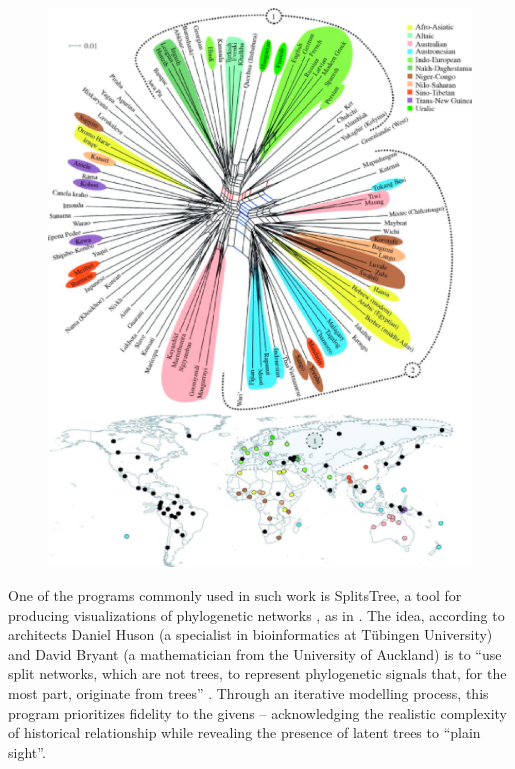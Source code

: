 \documentclass[output=paper]{langscibook}
\begin{document}
\begin{figure}
    \centering
    \includegraphics[scale=0.8]{figures/greenhiletal2010.png}
    \caption{\citet[2445]{Greenhilletal2010}}
    \label{fig:kaplan:greenhill2010}
\end{figure}

One of the programs commonly used in such work is SplitsTree, a tool for producing visualizations of phylogenetic networks \citep{Greenhilletal2010}, as in . The idea, according to architects Daniel Huson (a specialist in bioinformatics at Tübingen University) and David Bryant (a mathematician from the University of Auckland) is to ``use split networks, which are not trees, to represent phylogenetic signals that, for the most part, originate from trees'' \citep[254--267]{HusonBryant2006}. Through an iterative modelling process, this program prioritizes fidelity to the givens -- acknowledging the realistic complexity of historical relationship while revealing the presence of latent trees to ``plain sight''.
\end{document}
